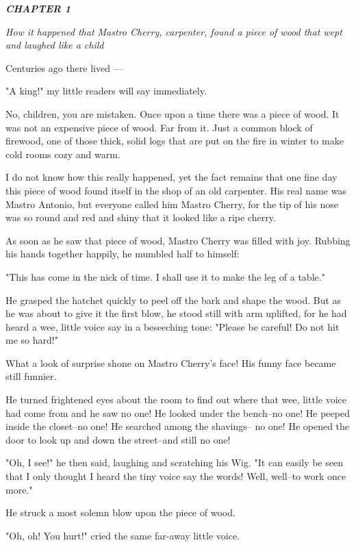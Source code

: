 \documentclass[12pt,twoside]{article}
\begin{document}
\bigskip
{\slshape%
  \textbf{CHAPTER 1}
  
  \emph{How it happened that Mastro Cherry, carpenter,
  found a piece of wood that wept and laughed like a child}
  \medskip
 
  Centuries ago there lived ---
  
  "A king!" my little readers will say immediately.
  
  No, children, you are mistaken.  Once upon a time
  there was a piece of wood.  It was not an expensive piece
  of wood.  Far from it.  Just a common block of firewood,
  one of those thick, solid logs that are put on the fire in
  winter to make cold rooms cozy and warm.
  
  I do not know how this really happened, yet the fact
  remains that one fine day this piece of wood found itself
  in the shop of an old carpenter.  His real name was
  Mastro Antonio, but everyone called him Mastro Cherry,
  for the tip of his nose was so round and red and shiny
  that it looked like a ripe cherry.
  
  As soon as he saw that piece of wood, Mastro Cherry
  was filled with joy.  Rubbing his hands together happily,
  he mumbled half to himself:
  
  "This has come in the nick of time.  I shall use it to
  make the leg of a table."
  
  He grasped the hatchet quickly to peel off the bark and
  shape the wood.  But as he was about to give it the first
  blow, he stood still with arm uplifted, for he had heard a
  wee, little voice say in a beseeching tone:  "Please be careful!
  Do not hit me so hard!"
  
  What a look of surprise shone on Mastro Cherry's
  face!  His funny face became still funnier.
  
  He turned frightened eyes about the room to find out
  where that wee, little voice had come from and he saw
  no one! He looked under the bench--no one! He peeped
  inside the closet--no one! He searched among the shavings--
  no one! He opened the door to look up and down
  the street--and still no one!

  "Oh, I see!" he then said, laughing and scratching his Wig.
  "It can easily be seen that I only thought I heard the tiny
  voice say the words! Well, well--to work once more."
  
  He struck a most solemn blow upon the piece of wood.
  
  "Oh, oh!  You hurt!" cried the same far-away little voice.
  
}
\end{document}
